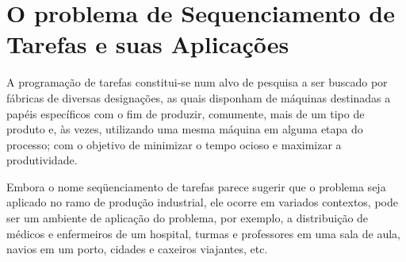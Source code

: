 \section{O problema de Sequenciamento de Tarefas e suas Aplicações}
A programação de tarefas constitui-se num alvo de pesquisa a ser buscado por fábricas de diversas designações, as quais disponham de máquinas destinadas a papéis específicos com o fim de produzir, comumente, mais de um tipo de produto e, às vezes, utilizando uma mesma máquina em alguma etapa do processo; com o objetivo de minimizar o tempo ocioso e maximizar a produtividade.

Embora o nome seqüenciamento de tarefas parece sugerir que o problema seja aplicado no ramo de produção industrial, ele ocorre em variados contextos, pode ser um ambiente de aplicação do problema, por exemplo, a distribuição de médicos e enfermeiros de um hospital, turmas e professores em uma sala de aula, navios em um porto, cidades e caxeiros viajantes, etc. \cite{REIS}



